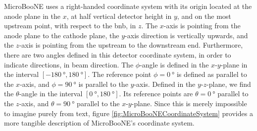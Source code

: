 MicroBooNE uses a right-handed coordinate system with its origin located at the anode plane in the $x$, at half vertical detector height in $y$, and on the most upstream point, with respect to the \gls{bnb}, in $z$. The $x$-axis is pointing from the anode plane to the cathode plane, the $y$-axis direction is vertically upwards, and the $z$-axis is pointing from the upstream to the downstream end. Furthermore, there are two angles defined in this detector coordinate system, in order to indicate directions, \ie in beam direction. The $\phi$-angle is defined in the $x$-$y$-plane in the interval $[\SI{-180}{\degree},\SI{180}{\degree}]$. The reference point $\phi = \SI{0}{\degree}$ is defined as parallel to the $x$-axis, and $\phi = \SI{90}{\degree}$ is parallel to the $y$-axis. Defined in the $y$-$z$-plane, we find the $\theta$-angle in the interval $[\SI{0}{\degree},\SI{180}{\degree}]$. Its reference points are $\theta = \SI{0}{\degree}$ parallel to the $z$-axis, and $\theta = \SI{90}{\degree}$ parallel to the $x$-$y$-plane. Since this is merely impossible to imagine purely from text, figure \ref{fig:MicroBooNECoordinateSystem} provides a more tangible description of MicroBooNE's coordinate system.
